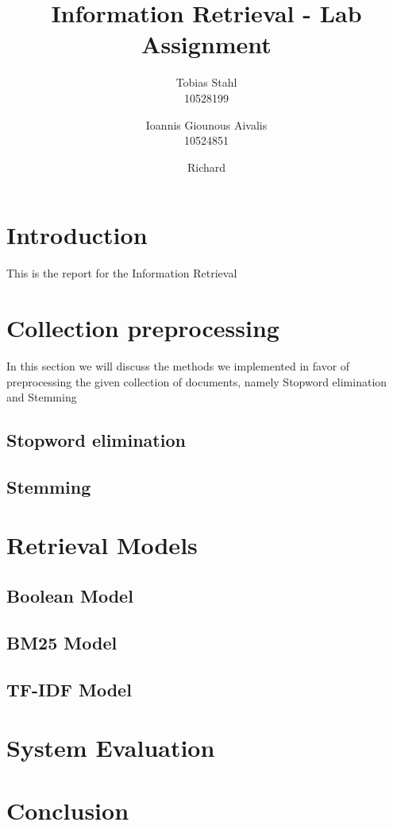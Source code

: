 \documentclass[11pt]{article}
\title{
	\textbf{Information Retrieval - Lab Assignment}
}
\author{Tobias Stahl \\ 10528199 \and Ioannis Giounous Aivalis \\ 10524851 \and Richard  \\ }
\begin{document}
\maketitle

\section{Introduction}
This is the report for the Information Retrieval

\section{Collection preprocessing}
In this section we will discuss the methods we implemented in favor of preprocessing the given collection of documents, namely Stopword elimination and Stemming

\subsection{Stopword elimination}

\subsection{Stemming}


\section{Retrieval Models}

\subsection{Boolean Model}

\subsection{BM25 Model}

\subsection{TF-IDF Model}

\section{System Evaluation}

\section{Conclusion}

\begin{thebibliography}{9}

\end{thebibliography}
\end{document}
